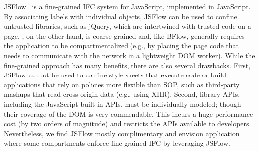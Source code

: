 JSFlow~\cite{JSFlow} is a fine-grained IFC system for JavaScript,
implemented in JavaScript.
%
By associating labels with individual objects, JSFlow can be used to
confine untrusted libraries, such as jQuery, which are intertwined with
trusted code on a page.
%
\sys{}, on the other hand, is coarse-grained and, like BFlow, generally
requires the application to be compartmentalized (e.g., by placing the
page code that needs to communicate with the network in a lightweight
DOM worker).
%
While the fine-grained approach has many benefits, there
are also several drawbacks.
%
First, JSFlow cannot be used to confine style sheets that execute code
or build applications that rely on policies more flexible than SOP,
such as third-party mashups that read cross-origin data (e.g., using
XHR).
%
%
Second, library APIs, including the JavaScript built-in APIs, must be
individually modeled; though their coverage of the DOM is very commendable.
%
This incurs a huge performance cost (by two orders of magnitude)
and restricts the APIs available to developers.
%
Nevertheless, we find JSFlow mostly complimentary and envision
application where some \sys{} compartments enforce fine-grained IFC by
leveraging JSFlow.




